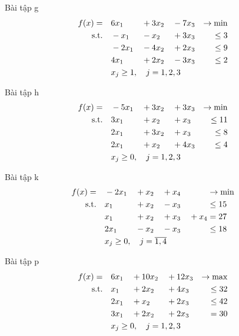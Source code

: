 \begin{exerciseblock}{Bài tập g}
\begin{alignat*}{4}
    f(x) = \quad & 6x_1 & {}+{} & 3x_2 & {}-{} & 7x_3 & \rightarrow \min \\
    \text{s.t.} \quad & -x_1 & {}-{} & x_2 & {}+{} & 3x_3 & \le 3 \\
    & -2x_1 & {}-{} & 4x_2 & {}+{} & 2x_3 & \le 9 \\
    & 4x_1 & {}+{} & 2x_2 & {}-{} & 3x_3 & \le 2 \\
    & \rlap{$x_j \ge 1, \quad j = 1,2,3$}
\end{alignat*}
\end{exerciseblock}

\begin{exerciseblock}{Bài tập h}
\begin{alignat*}{4}
    f(x) = \quad & -5x_1 & {}+{} & 3x_2 & {}+{} & 3x_3 & \rightarrow \min \\
    \text{s.t.} \quad & 3x_1 & {}+{} & x_2 & {}+{} & x_3 & \le 11 \\
    & 2x_1 & {}+{} & 3x_2 & {}+{} & x_3 & \le 8 \\
    & 2x_1 & {}+{} & x_2 & {}+{} & 4x_3 & \le 4 \\
    & \rlap{$x_j \ge 0, \quad j = 1,2,3$}
\end{alignat*}
\end{exerciseblock}

\begin{exerciseblock}{Bài tập k}
\begin{alignat*}{5}
    f(x) = \quad & -2x_1 & {}+{} & x_2 & {}+{} & x_4 & & \rightarrow \min \\
    \text{s.t.} \quad & x_1 & {}+{} & x_2 & {}-{} & x_3 & & \le 15 \\
    & x_1 & {}+{} & x_2 & {}+{} & x_3 & {}+{} x_4 & = 27 \\
    & 2x_1 & {}-{} & x_2 & {}-{} & x_3 & & \le 18 \\
    & \rlap{$x_j \ge 0, \quad j = \overline{1,4}$}
\end{alignat*}
\end{exerciseblock}

\begin{exerciseblock}{Bài tập p}
\begin{alignat*}{4}
    f(x) = \quad & 6x_1 & {}+{} & 10x_2 & {}+{} & 12x_3 & \rightarrow \max \\
    \text{s.t.} \quad & x_1 & {}+{} & 2x_2 & {}+{} & 4x_3 & \le 32 \\
    & 2x_1 & {}+{} & x_2 & {}+{} & 2x_3 & \le 42 \\
    & 3x_1 & {}+{} & 2x_2 & {}+{} & 2x_3 & = 30 \\
    & \rlap{$x_j \ge 0, \quad j = 1,2,3$}
\end{alignat*}
\end{exerciseblock}
